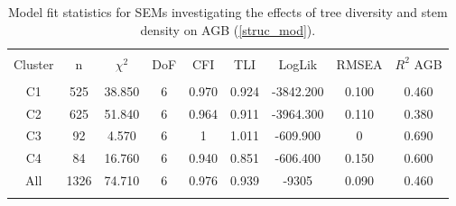 
\begin{table}[!htbp] \centering 
  \caption{Model fit statistics for SEMs investigating the effects of tree diversity and stem density on AGB (\autoref{struc_mod}).} 
  \label{struc_model_fit_clust_stats} 
\begin{tabular}{@{\extracolsep{0pt}} ccccccccc} 
\\[-1.8ex]\hline 
\hline \\[-1.8ex] 
{Cluster} & {n} & {$\chi^{2}$} & {DoF} & {CFI} & {TLI} & {LogLik} & {RMSEA} & {$R^{2}$ AGB} \\
\hline \\[-1.8ex] 
C1 & 525 & 38.850 & 6 & 0.970 & 0.924 & -3842.200 & 0.100 & 0.460 \\ 
C2 & 625 & 51.840 & 6 & 0.964 & 0.911 & -3964.300 & 0.110 & 0.380 \\ 
C3 & 92 & 4.570 & 6 & 1 & 1.011 & -609.900 & 0 & 0.690 \\ 
C4 & 84 & 16.760 & 6 & 0.940 & 0.851 & -606.400 & 0.150 & 0.600 \\ 
All & 1326 & 74.710 & 6 & 0.976 & 0.939 & -9305 & 0.090 & 0.460 \\ 
\hline \\[-1.8ex] 
\end{tabular} 
\end{table} 
